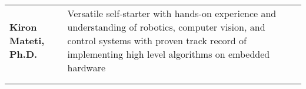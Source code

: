 \begin{tabular}{L{\lcolw} L{\rcolw}}
\textbf{\LARGE {Kiron Mateti, Ph.D.}} 
& {\large Versatile self-starter with hands-on experience and understanding of robotics, computer vision, and control systems  
with proven track record of implementing high level algorithms on embedded hardware} 
\\ 
\\
\hline \hline \\ 
\end{tabular}